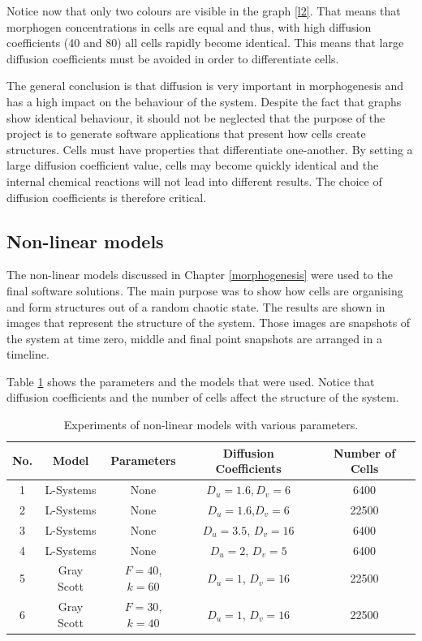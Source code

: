 Notice now that only two colours are visible in the graph \ref{l2}. That means that morphogen concentrations in cells are equal and thus, with high diffusion coefficients (40 and 80) all cells rapidly become identical. This means that large diffusion coefficients must be avoided in order to differentiate cells.

The general conclusion is that diffusion is very important in morphogenesis and has a high impact on the behaviour of the system. Despite the fact that graphs show identical behaviour, it should not be neglected that the purpose of the project is to generate software applications that present how cells create structures. Cells must have properties that differentiate one-another. By setting a large diffusion coefficient value, cells may become quickly identical and the internal chemical reactions will not lead into different results. The choice of diffusion coefficients is therefore critical.


\subsection{Non-linear models}
\label{resnonlinear}
The non-linear models discussed in Chapter \ref{morphogenesis} were used to the final software solutions. The main purpose was to show how cells are organising and form structures out of a random chaotic state. The results are shown in images that represent the structure of the system. Those images are snapshots of the system at time zero, middle and final point snapshots are arranged in a timeline. 

Table \ref{rdtable} shows the parameters and the models that were used. Notice that diffusion coefficients and the number of cells affect the structure of the system. 

\begin{table}
\begin{center}
\caption{Experiments of non-linear models with various parameters.}
\label{rdtable}
\begin{tabular}{| c | c | c | c | c |}
\hline
No. & Model & Parameters & Diffusion Coefficients & Number of Cells \\ \hline
1 & L-Systems & None & $ D_u=1.6, D_v=6 $ & 6400 \\ \hline
2 & L-Systems & None & $ D_u=1.6 $,$ D_v=6 $ & 22500 \\ \hline
3 & L-Systems & None & $ D_u=3.5 $, $ D_v=16 $ & 6400 \\ \hline
4 & L-Systems & None & $ D_u=2 $, $ D_v=5 $ & 6400 \\ \hline
5 & Gray Scott & $ F=40 $,$ k=60 $ & $ D_u=1 $, $ D_v=16 $ & 22500 \\ \hline
6 & Gray Scott & $ F=30 $,$ k=40 $ & $ D_u=1 $, $ D_v=16 $ & 22500 \\ \hline
\end{tabular}
\end{center}
\end{table}


